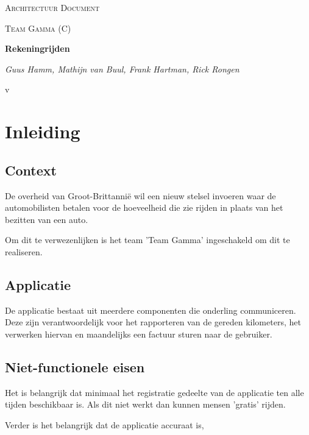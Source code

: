 \documentclass{scrreprt}
\begin{document}
	\begin{titlepage}
		\centering
		{\scshape\LARGE Architectuur Document \par}
		\vspace{1cm}
		{\scshape\Large Team Gamma (C)\par}
		\vspace{1.5cm}
		{\huge\bfseries Rekeningrijden\par}
		\vspace{2cm}
		{\large\itshape Guus Hamm, Mathijn van Buul, Frank Hartman, Rick Rongen\par}
		\vfill
		{\large v\vhCurrentVersion\par}
		{\large \vhCurrentDate\par}
	\end{titlepage}
	\tableofcontents
	\newpage
	\begin{versionhistory}
	\end{versionhistory}

	\newpage
	\chapter{Inleiding}
	\section{Context}
		De overheid van Groot-Brittannië wil een nieuw stelsel invoeren waar de automobilisten betalen voor de hoeveelheid die zie rijden in plaats van het bezitten van een auto.\par
		Om dit te verwezenlijken is het team 'Team Gamma' ingeschakeld om dit te realiseren. 
	\section{Applicatie}
		De applicatie bestaat uit meerdere componenten die onderling communiceren. Deze zijn verantwoordelijk voor het rapporteren van de gereden kilometers, het verwerken hiervan en maandelijks een factuur sturen naar de gebruiker.
	\section{Niet-functionele eisen}
		Het is belangrijk dat minimaal het registratie gedeelte van de applicatie ten alle tijden beschikbaar is. Als dit niet werkt dan kunnen mensen 'gratis' rijden.\par
		Verder is het belangrijk dat de applicatie accuraat is, 
\end{document}
